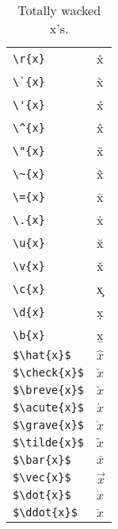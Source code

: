 \documentclass{article}
\begin{document}
\begin{table}
\begin{center}
\begin{tabular}{ll}
\verb#\r{x}#& \r{x}\\
\verb#\`{x}#& \`{x}\\
\verb#\'{x}#& \'{x}\\
\verb#\^{x}#& \^{x}\\
\verb#\"{x}#& \"{x}\\
\verb#\~{x}#& \~{x}\\
\verb#\={x}#& \={x}\\
\verb#\.{x}#& \.{x}\\
\verb#\u{x}#& \u{x}\\
\verb#\v{x}#& \v{x}\\
\verb#\c{x}#& \c{x}\\
\verb#\d{x}#& \d{x}\\
\verb#\b{x}#& \b{x}\\
\verb#$\hat{x}$#& $\hat{x}$\\
\verb#$\check{x}$#& $\check{x}$\\
\verb#$\breve{x}$#& $\breve{x}$\\
\verb#$\acute{x}$#& $\acute{x}$\\
\verb#$\grave{x}$#& $\grave{x}$\\
\verb#$\tilde{x}$#& $\tilde{x}$\\
\verb#$\bar{x}$#& $\bar{x}$\\
\verb#$\vec{x}$#& $\vec{x}$\\
\verb#$\dot{x}$#& $\dot{x}$\\
\verb#$\ddot{x}$#& $\ddot{x}$\\
\end{tabular}
\caption{Totally wacked x's.}
\end{center}
\end{table}
\end{document}
